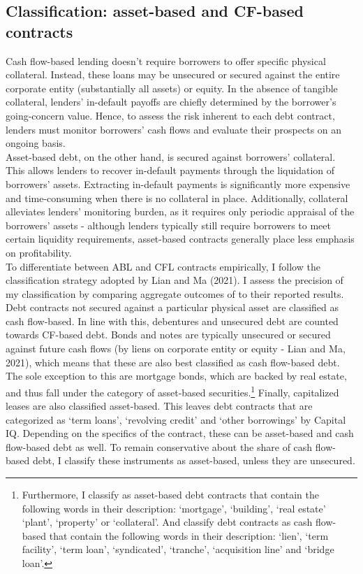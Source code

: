 \documentclass[12pt]{article}
\begin{document}
\subsection{Classification: asset-based and CF-based contracts \label{sec:classification}}
Cash flow-based lending doesn't require borrowers to offer specific physical collateral. Instead, these loans may be unsecured or secured against the entire corporate entity (substantially all assets) or equity. In the absence of tangible collateral, lenders' in-default payoffs are chiefly determined by the borrower's going-concern value. Hence, to assess the risk inherent to each debt contract, lenders must monitor borrowers’ cash flows and evaluate their prospects on an ongoing basis.  \vspace{3mm} \\
Asset-based debt, on the other hand, is secured against borrowers’ collateral. This allows lenders to recover in-default payments through the liquidation of borrowers' assets. Extracting in-default payments is significantly more expensive and time-consuming when there is no collateral in place. Additionally, collateral alleviates lenders’ monitoring burden, as it requires only periodic appraisal of the borrowers' assets - although lenders typically still require borrowers to meet certain liquidity requirements, asset-based contracts generally place less emphasis on profitability. \vspace{3mm} \\
To differentiate between ABL and CFL contracts empirically, I follow the classification strategy adopted by Lian and Ma (2021). I assess the precision of my classification by comparing aggregate outcomes of to their reported results. \vspace{3mm} \\
Debt contracts not secured against a particular physical asset are classified as cash flow-based. In line with this, debentures and unsecured debt are counted towards CF-based debt. Bonds and notes are typically unsecured or secured against future cash flows (by liens on corporate entity or equity - Lian and Ma, 2021), which means that these are also best classified as cash flow-based debt. The sole exception to this are mortgage bonds, which are backed by real estate, and thus fall under the category of asset-based securities.\footnote{Furthermore, I classify  as asset-based debt contracts that contain the following words in their description: `mortgage', `building', `real estate' `plant', `property' or `collateral'. And classify debt contracts as cash flow-based that contain the following words in their description: `lien', `term facility', `term loan', `syndicated', `tranche', `acquisition line' and `bridge loan'.} Finally, capitalized leases are also classified asset-based. This leaves debt contracts that are categorized as `term loans', `revolving credit' and `other borrowings' by Capital IQ. Depending on the specifics of the contract, these can be asset-based and cash flow-based debt as well. To remain conservative about the share of cash flow-based debt, I classify these instruments as asset-based, unless they are unsecured.  \vspace{3mm} \\
\end{document}
